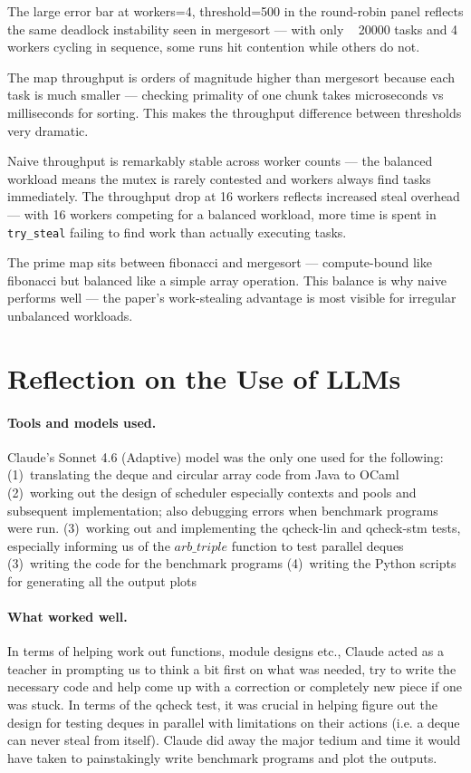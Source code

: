 \documentclass[11pt,a4paper]{article}
\begin{document}
The large error bar at workers=4, threshold=500 in the round-robin panel reflects
the same deadlock instability seen in mergesort — with only ~ 20000 tasks and
4 workers cycling in sequence, some runs hit contention while others do not.

The map throughput is orders of magnitude higher than mergesort because each
task is much smaller — checking primality of one chunk takes microseconds vs
milliseconds for sorting. This makes the throughput difference between thresholds
very dramatic.

Naive throughput is remarkably stable across worker counts — the balanced workload
means the mutex is rarely contested and workers always find tasks immediately.
The throughput drop at 16 workers reflects increased steal overhead — with 16
workers competing for a balanced workload, more time is spent in
\texttt{try\_steal} failing to find work than actually executing tasks.

The prime map sits between fibonacci and mergesort — compute-bound like fibonacci
but balanced like a simple array operation. This balance is why naive performs
well — the paper's work-stealing advantage is most visible for irregular
unbalanced workloads.



\section{Reflection on the Use of LLMs}
\label{sec:llm}

\paragraph{Tools and models used.}
Claude's Sonnet 4.6 (Adaptive) model was the only one used for the following:
     (1)~translating the deque and circular array code from Java to OCaml
     (2)~working out the design of scheduler especially contexts and pools and
     subsequent implementation; also debugging errors when benchmark programs were run.
     (3)~working out and implementing the qcheck-lin and qcheck-stm tests,
     especially informing us of the $arb\_triple$ function to test parallel deques
     (3)~writing the code for the benchmark programs
     (4)~writing the Python scripts for generating all the output plots

\paragraph{What worked well.}
In terms of helping work out functions, module designs etc., Claude acted
as a teacher in prompting us to think a bit first on what was needed, try to
write the necessary code and help come up with a correction or completely new
piece if one was stuck. In terms of the qcheck test, it was crucial in helping
figure out the design for testing deques in parallel with limitations on their
actions (i.e. a deque can never steal from itself). Claude did away the major
tedium and time it would have taken to painstakingly write benchmark programs
and plot the outputs.
\end{document}
